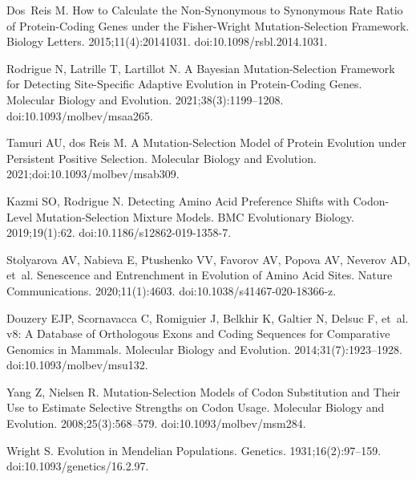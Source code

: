 \documentclass{article}
\begin{document}
\begin{thebibliography}{10}
        Dos~Reis M.
        \newblock How to Calculate the Non-Synonymous to Synonymous Rate Ratio of
        Protein-Coding Genes under the Fisher-Wright Mutation-Selection Framework.
        \newblock Biology Letters. 2015;11(4):20141031.
        \newblock doi:{10.1098/rsbl.2014.1031}.

        Rodrigue N, Latrille T, Lartillot N.
        \newblock A {{Bayesian}} Mutation-Selection Framework for Detecting
        Site-Specific Adaptive Evolution in Protein-Coding Genes.
        \newblock Molecular Biology and Evolution. 2021;38(3):1199--1208.
        \newblock doi:{10.1093/molbev/msaa265}.

        Tamuri AU, {dos Reis} M.
        \newblock A Mutation-Selection Model of Protein Evolution under Persistent
        Positive Selection.
        \newblock Molecular Biology and Evolution. 2021;doi:{10.1093/molbev/msab309}.

        Kazmi SO, Rodrigue N.
        \newblock Detecting Amino Acid Preference Shifts with Codon-Level
        Mutation-Selection Mixture Models.
        \newblock BMC Evolutionary Biology. 2019;19(1):62.
        \newblock doi:{10.1186/s12862-019-1358-7}.

        Stolyarova AV, Nabieva E, Ptushenko VV, Favorov AV, Popova AV, Neverov AD,
        et~al.
        \newblock Senescence and Entrenchment in Evolution of Amino Acid Sites.
        \newblock Nature Communications. 2020;11(1):4603.
        \newblock doi:{10.1038/s41467-020-18366-z}.

        Douzery EJP, Scornavacca C, Romiguier J, Belkhir K, Galtier N, Delsuc F, et~al.
         v8: {{A}} Database of Orthologous Exons and Coding
        Sequences for Comparative Genomics in Mammals.
        \newblock Molecular Biology and Evolution. 2014;31(7):1923--1928.
        \newblock doi:{10.1093/molbev/msu132}.

        Yang Z, Nielsen R.
        \newblock Mutation-Selection Models of Codon Substitution and Their Use to
        Estimate Selective Strengths on Codon Usage.
        \newblock Molecular Biology and Evolution. 2008;25(3):568--579.
        \newblock doi:{10.1093/molbev/msm284}.

        Wright S.
        \newblock Evolution in {{Mendelian}} Populations.
        \newblock Genetics. 1931;16(2):97--159.
        \newblock doi:{10.1093/genetics/16.2.97}.


\end{thebibliography}
\end{document}
